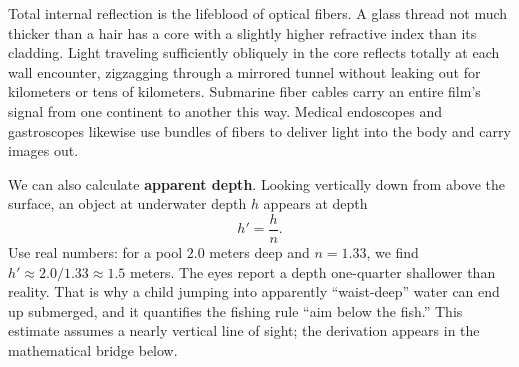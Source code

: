 Total internal reflection is the lifeblood of optical fibers. A glass thread not much thicker than a hair has a core with a slightly higher refractive index than its cladding. Light traveling sufficiently obliquely in the core reflects totally at each wall encounter, zigzagging through a mirrored tunnel without leaking out for kilometers or tens of kilometers. Submarine fiber cables carry an entire film's signal from one continent to another this way. Medical endoscopes and gastroscopes likewise use bundles of fibers to deliver light into the body and carry images out.

\begin{center}
\end{center}

We can also calculate \textbf{apparent depth}. Looking vertically down from above the surface, an object at underwater depth \(h\) appears at depth
\[
h'=\frac{h}{n}.
\]
Use real numbers: for a pool \(2.0\) meters deep and \(n=1.33\), we find \(h'\approx 2.0/1.33\approx 1.5\) meters. The eyes report a depth one-quarter shallower than reality. That is why a child jumping into apparently ``waist-deep'' water can end up submerged, and it quantifies the fishing rule ``aim below the fish.'' This estimate assumes a nearly vertical line of sight; the derivation appears in the mathematical bridge below.

